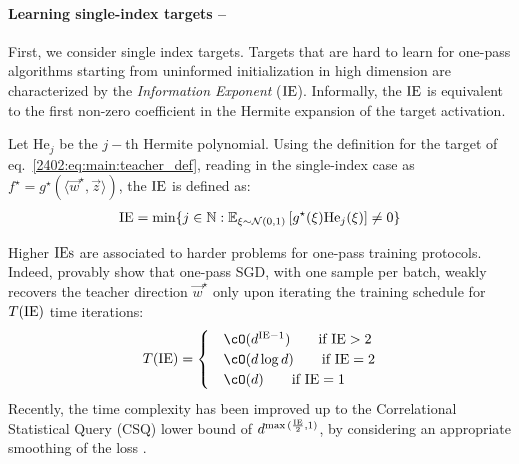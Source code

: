 \paragraph{Learning single-index targets --} 
First, we consider single index targets.
Targets that are hard to learn 
for one-pass algorithms starting from uninformed initialization in high dimension are characterized by the \textit{Information Exponent} ($\rm{IE}$). Informally, the $\rm{IE}$ is equivalent to the first non-zero coefficient in the Hermite expansion of the target activation. 
\begin{definition}
\label{2402:def:main:information_exponent}
\citep{arous2021online}
Let $\mathrm{He}_j$ be the $j-$th Hermite polynomial. Using the definition for the target of eq.~\eqref{2402:eq:main:teacher_def},  reading in the single-index case as $f^\star = g^\star(\langle \vec w^\star, \vec z \rangle)$,  the $\rm IE$ is defined as:
\begin{align}
{\rm{IE}} = \min \{j\in\mathbb{N}: \mathbb{E}_{\xi \sim \mathcal{N}(0,1)} \left[g^{\star}(\xi) \mathrm{He}_j(\xi)  \right]\neq 0\} 
\end{align}
\end{definition}
Higher $\rm IEs$ are associated to harder problems for one-pass training protocols. Indeed, \citep{arous2021online} provably show that one-pass SGD, with one sample per batch, weakly recovers the teacher direction $\vec w^\star$ only upon iterating the training schedule for $T(\rm IE)$ time iterations:
\begin{align}
\label{2402:eq:main:time_complexity_IE}
    T(\rm IE) = \begin{cases}
        &\cO(d^{\rm IE -1} ) \qquad \text{if $\rm{IE}>2$} \\
        &\cO(d \log{d} ) \qquad \text{if $\rm{IE}=2$} \\
        &\cO(d) \qquad \text{if $\rm{IE}=1$}
    \end{cases}
\end{align}
Recently, the time complexity has been improved up to the Correlational Statistical Query (CSQ) lower bound of $d^{\max{(\frac{\rm{IE}}{2}},1)}$, by considering an appropriate smoothing of the loss \citep{damian2023smoothing}.
